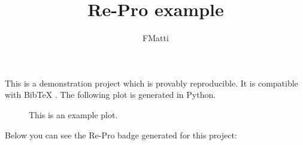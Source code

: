 \documentclass[12pt]{article}
\title{Re-Pro example}
\author{FMatti}
\begin{document}
\maketitle

This is a demonstration project which is provably reproducible.
It is compatible with BibTeX \cite{article2021}.
The following plot is generated in Python.

\begin{figure}[ht]
    \centering
    
    \caption{This is an example plot.}
\end{figure}

Below you can see the Re-Pro badge generated for this project:

\begin{figure}[ht]

\end{figure}



\end{document}
